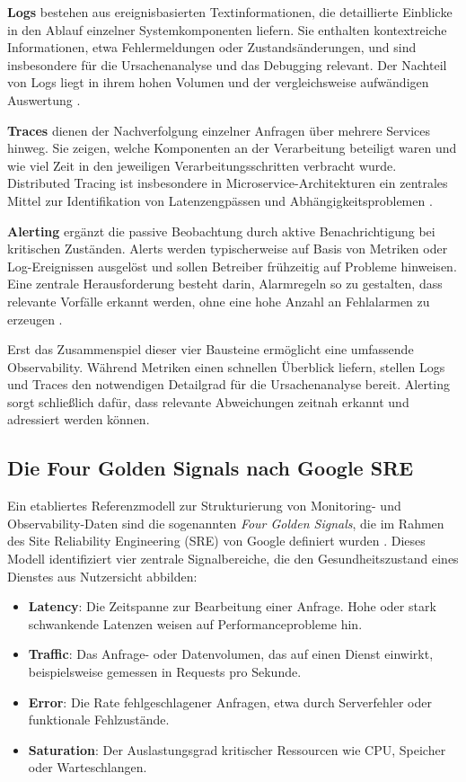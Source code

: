 \textbf{Logs} bestehen aus ereignisbasierten Textinformationen, die detaillierte Einblicke in den Ablauf einzelner Systemkomponenten liefern. Sie enthalten kontextreiche Informationen, etwa Fehlermeldungen oder Zustandsänderungen, und sind insbesondere für die Ursachenanalyse und das Debugging relevant. Der Nachteil von Logs liegt in ihrem hohen Volumen und der vergleichsweise aufwändigen Auswertung \cite{abieba2025advanced}.

\textbf{Traces} dienen der Nachverfolgung einzelner Anfragen über mehrere Services hinweg. Sie zeigen, welche Komponenten an der Verarbeitung beteiligt waren und wie viel Zeit in den jeweiligen Verarbeitungsschritten verbracht wurde. Distributed Tracing ist insbesondere in Microservice-Architekturen ein zentrales Mittel zur Identifikation von Latenzengpässen und Abhängigkeitsproblemen \cite{albuquerque2025tracing}.

\textbf{Alerting} ergänzt die passive Beobachtung durch aktive Benachrichtigung bei kritischen Zuständen. Alerts werden typischerweise auf Basis von Metriken oder Log-Ereignissen ausgelöst und sollen Betreiber frühzeitig auf Probleme hinweisen. Eine zentrale Herausforderung besteht darin, Alarmregeln so zu gestalten, dass relevante Vorfälle erkannt werden, ohne eine hohe Anzahl an Fehlalarmen zu erzeugen \cite{jalalvand2024alert}.

Erst das Zusammenspiel dieser vier Bausteine ermöglicht eine umfassende Observability. Während Metriken einen schnellen Überblick liefern, stellen Logs und Traces den notwendigen Detailgrad für die Ursachenanalyse bereit. Alerting sorgt schließlich dafür, dass relevante Abweichungen zeitnah erkannt und adressiert werden können.

\subsection{Die Four Golden Signals nach Google SRE}

Ein etabliertes Referenzmodell zur Strukturierung von Monitoring- und Observability-Daten sind die sogenannten \emph{Four Golden Signals}, die im Rahmen des Site Reliability Engineering (SRE) von Google definiert wurden \cite{ewaschukMonitoringDistributedSystems}. Dieses Modell identifiziert vier zentrale Signalbereiche, die den Gesundheitszustand eines Dienstes aus Nutzersicht abbilden:

\begin{itemize}
\item \textbf{Latency}: Die Zeitspanne zur Bearbeitung einer Anfrage. Hohe oder stark schwankende Latenzen weisen auf Performanceprobleme hin.
\item \textbf{Traffic}: Das Anfrage- oder Datenvolumen, das auf einen Dienst einwirkt, beispielsweise gemessen in Requests pro Sekunde.
\item \textbf{Error}: Die Rate fehlgeschlagener Anfragen, etwa durch Serverfehler oder funktionale Fehlzustände.
\item \textbf{Saturation}: Der Auslastungsgrad kritischer Ressourcen wie CPU, Speicher oder Warteschlangen.
\end{itemize}

